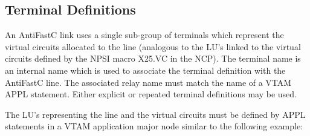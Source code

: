 \documentclass[letterpaper,10pt,english]{sphinxmanual}
\begin{document}
\ignorespaces 

\subsection{Terminal Definitions}
\label{\detokenize{connectivity_guide:index-80}}\label{\detokenize{connectivity_guide:id38}}
An AntiFastC link uses a single sub-group of terminals which represent the virtual circuits allocated to the line (analogous to the LU’s linked to the virtual circuits defined by the NPSI macro X25.VC in the NCP). The terminal name is an internal name which is used to associate the terminal definition with the AntiFastC line. The associated relay name must match the name of a VTAM APPL statement. Either explicit or repeated terminal definitions may be used.


The LU’s representing the line and the virtual circuits must be defined by APPL statements in a VTAM application major node similar to the following example:
\end{document}
